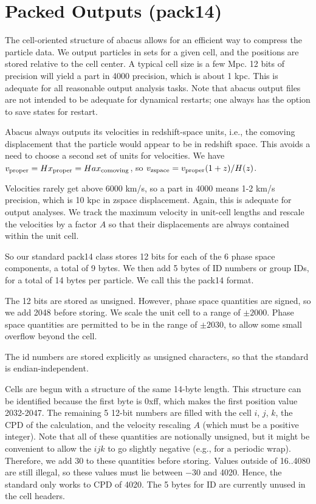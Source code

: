 \documentclass[11pt,preprint]{aastex}
\begin{document}
\section{Packed Outputs (pack14)}\label{sec:pack14}

The cell-oriented structure of abacus allows for an efficient way
to compress the particle data.  We output particles in sets for a
given cell, and the positions are stored relative to the cell center.
A typical cell size is a few Mpc.  12 bits of precision will yield
a part in 4000 precision, which is about 1 kpc.  This is adequate
for all reasonable output analysis tasks.  Note that abacus output
files are not intended to be adequate for dynamical restarts; one
always has the option to save states for restart.

Abacus always outputs its velocities in redshift-space units, i.e.,
the comoving displacement that the particle would appear to be in
redshift space.  This avoids a need to choose a second set of units
for velocities.  We have $v_{\rm proper} = Hx_{\rm proper} =
Hax_{\rm comoving}$, so $v_{\rm zspace} = v_{\rm proper}(1+z)/H(z)$.

Velocities rarely get above 6000 km/s, so a part in 4000 means 1-2
km/s precision, which is 10 kpc in zspace displacement.  Again, this
is adequate for output analyses.  We track the maximum velocity 
in unit-cell lengths and rescale the velocities by a factor $A$ 
so that their displacements are always contained within the unit cell.

So our standard pack14 class stores 12 bits for each of the 6 phase
space components, a total of 9 bytes.  We then add 5 bytes of ID
numbers or group IDs, for a total of 14 bytes per particle.  We call
this the pack14 format.

The 12 bits are stored as unsigned.  However, phase space quantities
are signed, so we add 2048 before storing.  We scale the unit cell 
to a range of $\pm2000$.  Phase space quantities are permitted to 
be in the range of $\pm2030$, to allow some small overflow beyond 
the cell.

The id numbers are stored explicitly as unsigned characters, so
that the standard is endian-independent.

Cells are begun with a structure of the same 14-byte length.  This
structure can be identified because the first byte is 0xff, which
makes the first position value 2032-2047.  The remaining 5
12-bit numbers are filled with the cell $i$, $j$, $k$, the CPD 
of the calculation, and the velocity rescaling $A$ (which must be
a positive integer).  Note that all of these quantities are notionally
unsigned, but it might be convenient to allow the  $ijk$ to go slightly
negative (e.g., for a periodic wrap).  Therefore, we add 30 to these
quantities before storing.  Values outside of 16..4080 are still illegal, 
so these values must lie between $-30$ and 4020.  Hence, the standard
only works to CPD of 4020.  The 5 bytes for ID are currently unused
in the cell headers.
\end{document}
